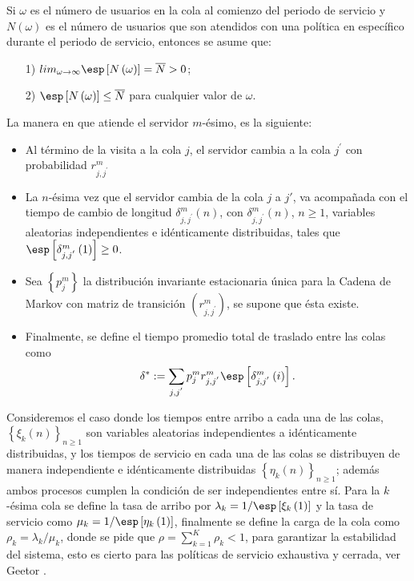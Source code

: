 Si $\omega$ es el n\'umero de usuarios en la cola al comienzo del
periodo de servicio y $N\left(\omega\right)$ es el n\'umero de
usuarios que son atendidos con una pol\'itica en espec\'ifico
durante el periodo de servicio, entonces se asume que:
\begin{itemize}
\item[1)]\label{S1}$lim_{\omega\rightarrow\infty}\esp\left[N\left(\omega\right)\right]=\overline{N}>0$;
\item[2)]\label{S2}$\esp\left[N\left(\omega\right)\right]\leq\overline{N}$
para cualquier valor de $\omega$.
\end{itemize}
La manera en que atiende el servidor $m$-\'esimo, es la siguiente:
\begin{itemize}
\item Al t\'ermino de la visita a la cola $j$, el servidor cambia
a la cola $j^{'}$ con probabilidad $r_{j,j^{'}}^{m}$

\item La $n$-\'esima vez que el servidor cambia de la cola $j$ a
$j'$, va acompa\~nada con el tiempo de cambio de longitud
$\delta_{j,j^{'}}^{m}\left(n\right)$, con
$\delta_{j,j^{'}}^{m}\left(n\right)$, $n\geq1$, variables
aleatorias independientes e id\'enticamente distribuidas, tales
que $\esp\left[\delta_{j,j^{'}}^{m}\left(1\right)\right]\geq0$.

\item Sea $\left\{p_{j}^{m}\right\}$ la distribuci\'on invariante
estacionaria \'unica para la Cadena de Markov con matriz de
transici\'on $\left(r_{j,j^{'}}^{m}\right)$, se supone que \'esta
existe.

\item Finalmente, se define el tiempo promedio total de traslado
entre las colas como
\begin{equation}
\delta^{*}:=\sum_{j,j^{'}}p_{j}^{m}r_{j,j^{'}}^{m}\esp\left[\delta_{j,j^{'}}^{m}\left(i\right)\right].
\end{equation}
\end{itemize}

Consideremos el caso donde los tiempos entre arribo a cada una de
las colas, $\left\{\xi_{k}\left(n\right)\right\}_{n\geq1}$ son
variables aleatorias independientes a id\'enticamente
distribuidas, y los tiempos de servicio en cada una de las colas
se distribuyen de manera independiente e id\'enticamente
distribuidas $\left\{\eta_{k}\left(n\right)\right\}_{n\geq1}$;
adem\'as ambos procesos cumplen la condici\'on de ser
independientes entre s\'i. Para la $k$-\'esima cola se define la
tasa de arribo por
$\lambda_{k}=1/\esp\left[\xi_{k}\left(1\right)\right]$ y la tasa
de servicio como
$\mu_{k}=1/\esp\left[\eta_{k}\left(1\right)\right]$, finalmente se
define la carga de la cola como $\rho_{k}=\lambda_{k}/\mu_{k}$,
donde se pide que $\rho=\sum_{k=1}^{K}\rho_{k}<1$, para garantizar
la estabilidad del sistema, esto es cierto para las pol\'iticas de
servicio exhaustiva y cerrada, ver Geetor \cite{Getoor}.\\

